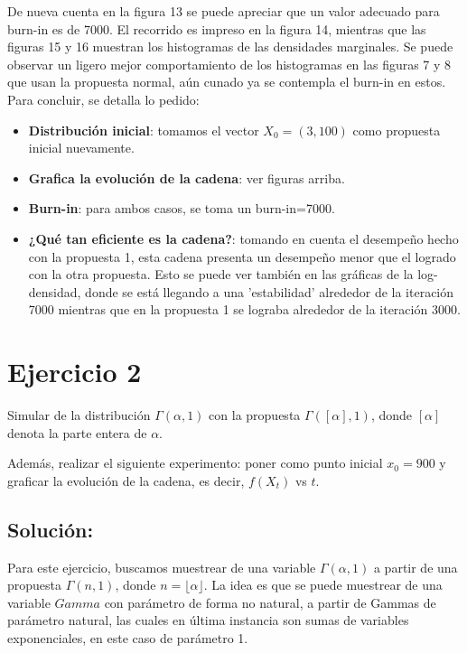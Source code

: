 \documentclass[letterpaper]{article}
\newcommand{\1}{\mathds{1}}
\theoremstyle{definition}
\theoremstyle{definition}
\theoremstyle{definition}
\theoremstyle{definition}
\theoremstyle{definition}
\begin{document}
De nueva cuenta en la figura 13 se puede apreciar que un valor adecuado para burn-in es de 7000. 
El recorrido es impreso en la figura 14, mientras que las figuras 15 y 16 muestran los histogramas 
de las densidades marginales. Se puede observar un ligero mejor comportamiento de los histogramas en 
las figuras 7 y 8 que usan la propuesta normal, aún cunado ya se contempla el burn-in en estos.
\\

Para concluir, se detalla lo pedido:

\begin{itemize}
    \item \textbf{Distribución inicial}: tomamos el vector $X_0=(3,100)$ como propuesta inicial nuevamente. 
    \item \textbf{Grafica la evolución de la cadena}: ver figuras arriba.
    \item \textbf{Burn-in}: para ambos casos, se toma un burn-in=7000.
    \item \textbf{¿Qué tan eficiente es la cadena?}: tomando en cuenta el desempeño hecho con la propuesta 1, esta cadena presenta un desempeño 
    menor que el logrado con la otra propuesta. Esto se puede ver también en las gráficas de la log-densidad, donde 
    se está llegando a una 'estabilidad' alrededor de la iteración 7000 mientras que en la propuesta 1 se lograba alrededor de la iteración 3000.
\end{itemize}

\section*{Ejercicio 2}
Simular de la distribución $\Gamma(\alpha,1)$ con la propuesta $\Gamma(\left[\alpha\right],1)$,
    donde $\left[\alpha\right]$ denota la parte entera de $\alpha$.
    \newline

    Además, realizar el siguiente experimento: poner como punto inicial $x_0=900$ y graficar 
    la evolución de la cadena, es decir, $f(X_t)$ vs $t$.
    \subsection*{Solución:}
    Para este ejercicio, buscamos muestrear de una variable $\Gamma(\alpha,1)$ a partir de una 
    propuesta $\Gamma(n,1)$, donde $n=\lfloor\alpha\rfloor$. La idea es que se puede muestrear de 
    una variable $Gamma$ con parámetro de forma no natural, a partir de Gammas de parámetro natural, 
    las cuales en última instancia son sumas de variables exponenciales, en este caso de parámetro 1.
    \newline
    
\end{document}
